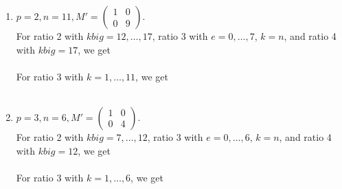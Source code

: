 \documentclass[letterpaper,12pt]{article}
\begin{document}
\begin{enumerate}
\item $p=2, n=11, M' = \begin{pmatrix}
1 & 0 \\ 0 & 9
\end{pmatrix}.$ \\
For ratio 2 with $kbig = 12, \dots, 17$, ratio 3 with $e = 0, \dots, 7$, $k=n$, and ratio 4 with $kbig = 17$, we get \\
 \\
For ratio 3 with $k = 1, \dots, 11$, we get \\
 \\

\item $p=3, n=6, M' = \begin{pmatrix}
1 & 0 \\ 0 & 4
\end{pmatrix}.$ \\
For ratio 2 with $kbig = 7, \dots, 12$, ratio 3 with $e = 0, \dots, 6$, $k=n$, and ratio 4 with $kbig = 12$, we get \\
 \\
For ratio 3 with $k = 1, \dots, 6$, we get \\
 \\


\end{enumerate}
\end{document}
